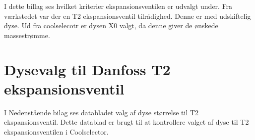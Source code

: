 \documentclass[Hovedrapport.tex]{subfiles}
\begin{document}
I dette billag ses hvilket kriterier ekspansionsventilen er udvalgt under. Fra værkstedet var der en T2 ekspansionsventil tilrådighed. Denne er med udskiftelig dyse. Ud fra coolselecotr er dysen X0 valgt, da denne giver de ønskede massestrømme. 
\begin{minipage}{1.0\textwidth}

\end{minipage}



\newpage
\section{Dysevalg til Danfoss T2 ekspansionsventil}
    \label{sec:bil_Danfos_dysevalg}
I Nedenstående bilag ses databladet valg af dyse størrelse til T2 ekspansionsventil. Dette datablad er brugt til at kontrollere valget af dyse til T2 ekspansionsventilen i Coolselector.
\begin{minipage}{1.0\textwidth}

\end{minipage}
\newpage






\end{document}
